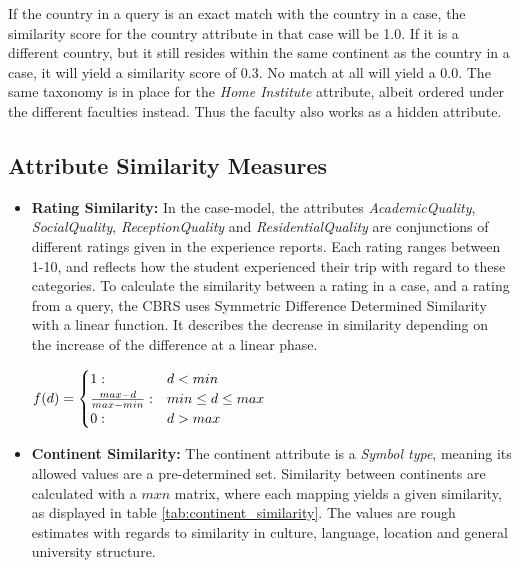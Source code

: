 If the country in a query is an exact match with the country in a case, the similarity score for the country attribute in that case will be 1.0. If it is a different country, but it still resides within the same continent as the country in a case, it will yield a similarity score of 0.3. No match at all will yield a 0.0. The same taxonomy is in place for the \emph{Home Institute} attribute, albeit ordered under the different faculties instead. Thus the faculty also works as a hidden attribute.

\subsection{Attribute Similarity Measures}

\begin{itemize}
    \item \textbf{Rating Similarity:} In the case-model, the attributes \emph{AcademicQuality}, \emph{SocialQuality}, \emph{ReceptionQuality} and \emph{ResidentialQuality} are conjunctions of different ratings given in the experience reports. Each rating ranges between 1-10, and reflects how the student experienced their trip with regard to these categories. To calculate the similarity between a rating in a case, and a rating from a query, the CBRS uses Symmetric Difference Determined Similarity\cite{bergmann2002experience} with a linear function. It describes the decrease in similarity depending on the increase of the difference at a linear phase.
    
$\begin{displaystyle}
    f(d) = 
    \begin{cases} 1 : & d < min \\ 
    \frac{max-d}{max-min} : & min \leq d \leq max \\
    0 : & d > max
    \end{cases}
\end{displaystyle}$

    \item \textbf{Continent Similarity:} The continent attribute is a \emph{Symbol type}, meaning its allowed values are a pre-determined set. Similarity between continents are calculated with a $m x n$ matrix, where each mapping yields a given similarity, as displayed in table \ref{tab:continent_similarity}. The values are rough estimates with regards to similarity in culture, language, location and general university structure.


\end{itemize}

